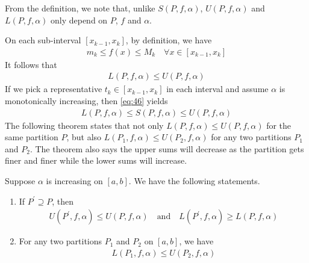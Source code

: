 \documentclass[thmcnt=section, 12pt]{my-elegantbook}
\begin{document}
\begin{note}
    From the definition, we note that, unlike $S(P,f,\alpha)$, $U(P,f,\alpha)$ and $L(P,f,\alpha)$ only depend on $P$, $f$ and $\alpha$.
\end{note}

On each sub-interval $[x_{k-1}, x_k]$, by definition, we have
\begin{align}
    m_k \leq f(x) \leq M_k
    \quad \forall x \in [x_{k-1}, x_k]
    \label{eq:46}
\end{align}
It follows that
\begin{align}
    L(P,f,\alpha) \leq U(P,f,\alpha)
    \label{eq:45}
\end{align}
If we pick a representative $t_k \in [x_{k-1}, x_k]$ in each interval and assume $\alpha$ is monotonically increasing, then \eqref{eq:46} yields
\begin{align*}
    L(P,f,\alpha) \leq S(P,f,\alpha) \leq U(P,f,\alpha)
\end{align*}
The following theorem states that not only $L(P,f,\alpha) \leq U(P,f,\alpha)$ for the same partition $P$, but also $L(P_1,f,\alpha) \leq U(P_2,f,\alpha)$ for any two partitions $P_1$ and $P_2$. The theorem also says the upper sums will decrease as the partition gets finer and finer while the lower sums will increase.

\begin{theorem} \label{thm:26}
    Suppose $\alpha$ is increasing on $[a, b]$. We have the following statements.
    \begin{enumerate}
        \item If $P^\prime \supseteq P$, then
              \begin{align*}
                  U(P^\prime,f,\alpha) \leq U(P,f,\alpha)
                  \quad\text{and}\quad
                  L(P^\prime,f,\alpha) \geq L(P,f,\alpha)
              \end{align*}
        \item For any two partitions $P_1$ and $P_2$ on $[a, b]$, we have
              \begin{align*}
                  L(P_1, f, \alpha) \leq U(P_2, f, \alpha)
              \end{align*}
    \end{enumerate}
\end{theorem}
\end{document}
